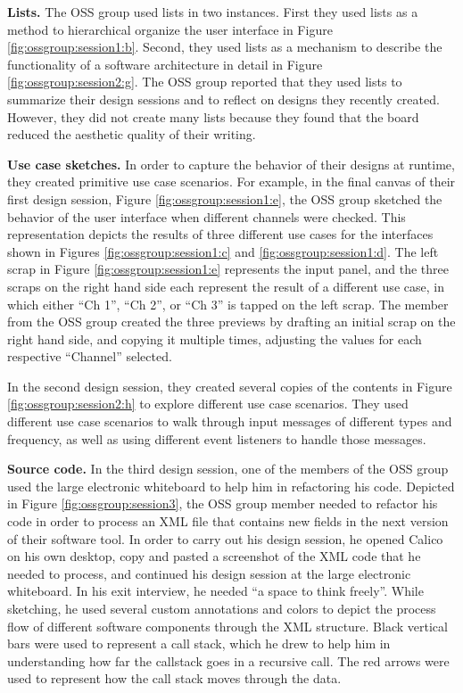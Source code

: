 \textbf{Lists. } The OSS group used lists in two instances. First they used lists as a method to hierarchical organize the user interface in Figure \ref{fig:ossgroup:session1:b}. Second, they used lists as a mechanism to describe the functionality of a software architecture in detail in Figure \ref{fig:ossgroup:session2:g}. The OSS group reported that they used lists to summarize their design sessions and to reflect on designs they recently created. However, they did not create many lists because they found that the board reduced the aesthetic quality of their writing.

\textbf{Use case sketches. } In order to capture the behavior of their designs at runtime, they created primitive use case scenarios. For example, in the final canvas of their first design session, Figure \ref{fig:ossgroup:session1:e}, the OSS group sketched the behavior of the user interface when different channels were checked. This representation depicts the results of three different use cases for the interfaces shown in Figures \ref{fig:ossgroup:session1:c} and \ref{fig:ossgroup:session1:d}. The left scrap in Figure \ref{fig:ossgroup:session1:e} represents the input panel, and the three scraps on the right hand side each represent the result of a different use case, in which either ``Ch 1'', ``Ch 2'', or ``Ch 3'' is tapped on the left scrap. The member from the OSS group created the three previews by drafting an initial scrap on the right hand side, and copying it multiple times, adjusting the values for each respective ``Channel'' selected. 

In the second design session, they created several copies of the contents in Figure \ref{fig:ossgroup:session2:h} to explore different use case scenarios. They used different use case scenarios to walk through input messages of different types and frequency, as well as using different event listeners to handle those messages.

\textbf{Source code. } In the third design session, one of the members of the OSS group used the large electronic whiteboard to help him in refactoring his code. Depicted in Figure \ref{fig:ossgroup:session3}, the OSS group member needed to refactor his code in order to process an XML file that contains new fields in the next version of their software tool. In order to carry out his design session, he opened Calico on his own desktop, copy and pasted a screenshot of the XML code that he needed to process, and continued his design session at the large electronic whiteboard. In his exit interview, he needed ``a space to think freely''. While sketching, he used several custom annotations and colors to depict the process flow of different software components through the XML structure. Black vertical bars were used to represent a call stack, which he drew to help him in understanding how far the callstack goes in a recursive call. The red arrows were used to represent how the call stack moves through the data.

